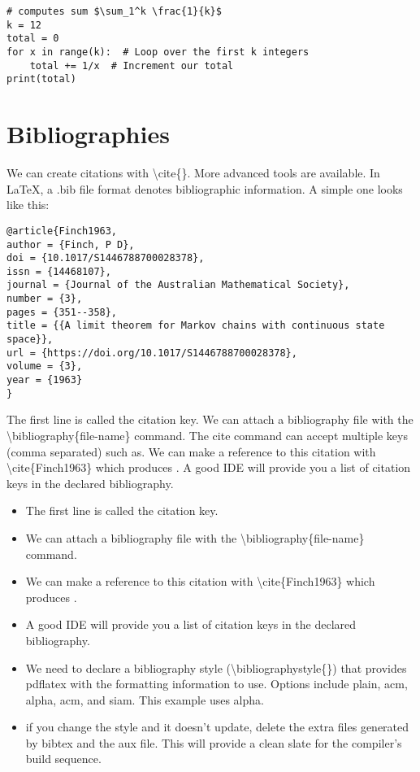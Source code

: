 \documentclass[11pt]{article}
\begin{document}
\begin{listing}[H]
\begin{verbatim}
# computes sum $\sum_1^k \frac{1}{k}$
k = 12
total = 0
for x in range(k):  # Loop over the first k integers
    total += 1/x  # Increment our total
print(total)
\end{verbatim}
\caption[Minted is Awesome]{Our python file has \LaTeX{} in the comments!}
\end{listing}

\section{Bibliographies}
We can create citations with \textbackslash cite\{\}. More advanced tools are available. In \LaTeX, a .bib file format denotes bibliographic information. A simple one looks like this:
\begin{verbatim}
@article{Finch1963,
author = {Finch, P D},
doi = {10.1017/S1446788700028378},
issn = {14468107},
journal = {Journal of the Australian Mathematical Society},
number = {3},
pages = {351--358},
title = {{A limit theorem for Markov chains with continuous state space}},
url = {https://doi.org/10.1017/S1446788700028378},
volume = {3},
year = {1963}
}\end{verbatim}
The first line is called the citation key.
We can attach a bibliography file with the \textbackslash bibliography\{file-name\} command. The cite command can accept multiple keys (comma separated) such as\cite{Finch1963, Ludwig1975}. We can make a reference to this citation with \textbackslash cite\{Finch1963\} which produces \cite{Finch1963}. A good IDE will provide you a list of citation keys in the declared bibliography. 
\begin{itemize}
	\item The first line is called the citation key.
	\item We can attach a bibliography file with the \textbackslash bibliography\{file-name\} command. 
	\item We can make a reference to this citation with \textbackslash cite\{Finch1963\} which produces \cite{Finch1963}. 
	\item A good IDE will provide you a list of citation keys in the declared bibliography. 
	\item We need to declare a bibliography style (\textbackslash bibliographystyle\{\}) that provides pdflatex with the formatting information to use. Options include plain, acm, alpha, acm, and siam. This example uses alpha.
	\item if you change the style and it doesn't update, delete the extra files generated by bibtex and the aux file. This will provide a clean slate for the compiler's build sequence. 
\end{itemize}
\end{document}
